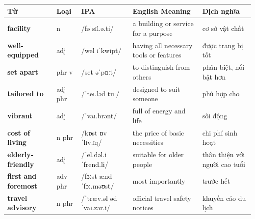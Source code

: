 \vspace{0.8em}
\begin{center}
\renewcommand{\arraystretch}{1.65}
\begin{tabularx}{\textwidth}{|V{0.22\textwidth}|C{0.07\textwidth}|I{0.20\textwidth}|Y|V{0.18\textwidth}|}
\hline
{}
\textbf{Từ} & \textbf{Loại} & \textbf{IPA} & \textbf{English Meaning} & \textbf{Dịch nghĩa} \\
\hline
\textbf{facility} & n & /fəˈsɪl.ə.ti/ & a building or service for a purpose & cơ sở vật chất \\ \hline
\textbf{well-equipped} & adj & /wel ɪˈkwɪpt/ & having all necessary tools or features & được trang bị tốt \\ \hline
\textbf{set apart} & phr v & /set əˈpɑːt/ & to distinguish from others & phân biệt, nổi bật hơn \\ \hline
\textbf{tailored to} & adj phr & /ˈteɪ.ləd tuː/ & designed to suit someone & phù hợp cho \\ \hline
\textbf{vibrant} & adj & /ˈvaɪ.brənt/ & full of energy and life & sôi động \\ \hline
\textbf{cost of living} & n phr & /kɒst ɒv ˈlɪv.ɪŋ/ & the price of basic necessities & chi phí sinh hoạt \\ \hline
\textbf{elderly-friendly} & adj & /ˈel.dəl.i ˈfrend.li/ & suitable for older people & thân thiện với người cao tuổi \\ \hline
\textbf{first and foremost} & adv phr & /fɜːst ænd ˈfɔː.məʊst/ & most importantly & trước hết \\ \hline
\textbf{travel advisory} & n phr & /ˈtræv.əl ədˈvaɪ.zər.i/ & official travel safety notices & khuyến cáo du lịch \\ \hline
\end{tabularx}
\end{center}

\newpage

